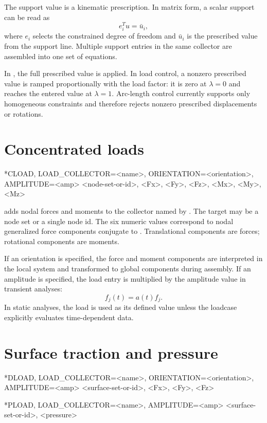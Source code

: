 The support value is a kinematic prescription. In matrix form, a scalar support can be read as
\[
e_i^T u = \bar u_i ,
\]
where \(e_i\) selects the constrained degree of freedom and \(\bar u_i\) is the prescribed value from the support line. Multiple support entries in the same collector are assembled into one set of equations.

In , the full prescribed value is applied. In  load control, a nonzero prescribed value is ramped proportionally with the load factor: it is zero at \(\lambda=0\) and reaches the entered value at \(\lambda=1\). Arc-length control currently supports only homogeneous constraints and therefore rejects nonzero prescribed displacements or rotations.

\section{Concentrated loads}

\begin{syntax}
*CLOAD, LOAD_COLLECTOR=<name>, ORIENTATION=<orientation>, AMPLITUDE=<amp>
<node-set-or-id>, <Fx>, <Fy>, <Fz>, <Mx>, <My>, <Mz>
\end{syntax}

 adds nodal forces and moments to the collector named by . The target may be a node set or a single node id. The six numeric values correspond to nodal generalized force components conjugate to \dofvec. Translational components are forces; rotational components are moments.

If an orientation is specified, the force and moment components are interpreted in the local system and transformed to global components during assembly. If an amplitude is specified, the load entry is multiplied by the amplitude value in transient analyses:
\[
f_j(t) = a(t) f_j .
\]
In static analyses, the load is used as its defined value unless the loadcase explicitly evaluates time-dependent data.

\section{Surface traction and pressure}

\begin{syntax}
*DLOAD, LOAD_COLLECTOR=<name>, ORIENTATION=<orientation>, AMPLITUDE=<amp>
<surface-set-or-id>, <Fx>, <Fy>, <Fz>
\end{syntax}

\begin{syntax}
*PLOAD, LOAD_COLLECTOR=<name>, AMPLITUDE=<amp>
<surface-set-or-id>, <pressure>
\end{syntax}

